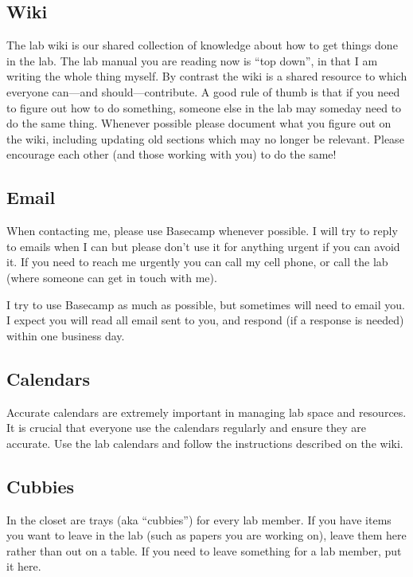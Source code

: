 \documentclass[letterpaper,12pt,oneside]{memoir}
\begin{document}
\subsection{Wiki}

The lab wiki is our shared collection of knowledge about how to get things done in the lab. The lab manual you are reading now is ``top down'', in that I am writing the whole thing myself. By contrast the wiki is a shared resource to which everyone can---and should---contribute. A good rule of thumb is that if you need to figure out how to do something, someone else in the lab may someday need to do the same thing. Whenever possible please document what you figure out on the wiki, including updating old sections which may no longer be relevant. Please encourage each other (and those working with you) to do the same!


\subsection{Email}
When contacting me, please use Basecamp whenever possible. I will try to reply to emails when I can but please don't use it for anything urgent if you can avoid it. If you need to reach me urgently you can call my cell phone, or call the lab (where someone can get in touch with me).

I try to use Basecamp as much as possible, but sometimes will need to email you. I expect you will read all email sent to you, and respond (if a response is needed) within one business day.

\subsection{Calendars}

Accurate calendars are extremely important in managing lab space and resources. It is crucial that everyone use the calendars regularly and ensure they are accurate. Use the lab calendars and follow the instructions described on the wiki.


\subsection{Cubbies}

In the closet are trays (aka ``cubbies'') for every lab member. If you have items you want to leave in the lab (such as papers you are working on), leave them here rather than out on a table. If you need to leave something for a lab member, put it here.
\end{document}
